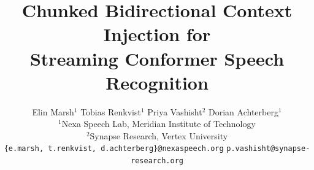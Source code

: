 \pagestyle{fancy}
\fancyhf{}
\renewcommand{\headrulewidth}{0.4pt}
\fancyhead[R]{\footnotesize\color{isgray}\thepage}

\setlength{\parindent}{1em}
\setlength{\parskip}{0pt}



\title{\vspace{-0.4em}\textbf{\color{isblue}Chunked Bidirectional Context Injection for\\ Streaming Conformer Speech Recognition}}

\author{
Elin Marsh$^{1}$ \quad Tobias Renkvist$^{1}$ \quad Priya Vashisht$^{2}$ \quad Dorian Achterberg$^{1}$ \\[4pt]
\normalsize$^{1}$Nexa Speech Lab, Meridian Institute of Technology \\
\normalsize$^{2}$Synapse Research, Vertex University \\
\normalsize\texttt{\{e.marsh, t.renkvist, d.achterberg\}@nexaspeech.org} \quad \texttt{p.vashisht@synapse-research.org}
}
\date{}
